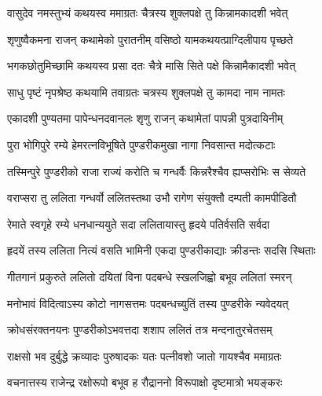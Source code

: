 \hyperref[sec:ekadashi_mahatmyam_vrata_raja]{\closesub}
\clearpage

\label{sec:vrata-raja-chaitra-shukla-kamada}


\twolineshloka
{वासुदेव नमस्तुभ्यं कथयस्व ममाग्रतः}
{चैत्रस्य शुक्लपक्षे तु किन्नामकादशी भवेत्} %


\twolineshloka
{शृणुष्वैकमना राजन् कथामेको पुरातनीम्}
{वसिष्ठो यामकथयत्प्राग्दिलीपाय पृच्छते} %


\twolineshloka
{भगकछोतुमिच्छामि कथयस्व प्रसा दतः}
{चैत्रे मासि सिते पक्षे किन्नामैकादशी भवेत्} %


\twolineshloka
{साधु पृष्टं नृपश्रेष्ठ कथयामि तवाग्रतः}
{चत्रस्य शुक्लपक्षे तु कामदा नाम नामतः} %

\twolineshloka
{एकादशी पुण्यतमा पापेन्धनदवानलः}
{शृणु राजन् कथामेतां पापन्नी पुत्रदायिनीम्} %

\twolineshloka
{पुरा भोगिपुरे रम्ये हेमरत्नविभूषिते}
{पुण्डरीकमुखा नागा निवसान्त मदोत्कटाः} %

\twolineshloka
{तस्मिन्पुरे पुण्डरीको राजा राज्यं करोति च}
{गन्धर्वैः किन्नरैश्चैव ह्यप्सरोभिः स सेव्यते} %

\twolineshloka
{वराप्सरा तु ललिता गन्धर्वो ललितस्तथा}
{उभौ रागेण संयुक्तौ दम्पती कामपीडितौ} %

\twolineshloka
{रेमाते स्वगृहे रम्ये धनधान्ययुते सदा}
{ललितायास्तु हृदये पतिर्वसति सर्वदा} %

\twolineshloka
{हृदयें तस्य ललिता नित्यं वसति भामिनी}
{एकदा पुण्डरीकाद्याः क्रीडन्तः सदसि स्थिताः} %

\twolineshloka
{गीतगानं प्रकुरुते ललितो दयितां विना}
{पदबन्धे स्खलजिह्वो बभूव ललितां स्मरन्} %

\twolineshloka
{मनोभावं विदित्वाऽस्य कोटो नागसत्तमः}
{पदबन्धच्युतिं तस्य पुण्डरीके न्यवेदयत्} %

\twolineshloka
{क्रोधसंरक्तनयनः पुण्डरीकोऽभवत्तदा}
{शशाप ललितं तत्र मन्दनातुरचेतसम्} %

\twolineshloka
{राक्षसो भव दुर्बुद्धे क्रव्यादः पुरुषादकः}
{यतः पत्नीवशो जातो गायश्चैव ममाग्रतः} %

\twolineshloka
{वचनात्तस्य राजेन्द्र रक्षोरूपो बभूव ह}
{रौद्राननो विरूपाक्षो दृष्टमात्रो भयङ्करः} %

